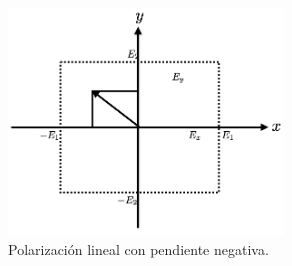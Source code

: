\documentclass[11pt,fleqn]{book} %
\begin{document}
\begin{figure}[h!]
\centering
\includegraphics[width=0.65\textwidth]{Pictures/polarizacionnegatica.png}
\caption{Polarizaci\'on lineal con pendiente negativa.}
\end{figure}
\end{document}
